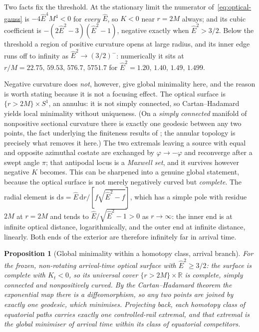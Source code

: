 \documentclass[12pt]{iopart}
\theoremstyle{plain}
\newtheorem{proposition}{Proposition}
\theoremstyle{definition}
\theoremstyle{remark}
\newcommand{\Ehat}{\hat E}
\newcommand{\dd}{\mathrm{d}}
\begin{document}
Two facts fix the threshold. At the stationary limit the numerator
of~\eqref{eq:optical-gauss} is $-4\Ehat^4M^4<0$ for \emph{every} $\Ehat$, so $K<0$
near $r=2M$ always; and its cubic coefficient is
$-(2\Ehat^2-3)(\Ehat^2-1)$, negative exactly when $\Ehat^2>3/2$. Below the
threshold a region of positive curvature opens at large radius, and its inner
edge runs off to infinity as $\Ehat^2\to(3/2)^-$: numerically it sits at
$r/M=22.75,\,59.53,\,576.7,\,5751.7$ for $\Ehat^2=1.20,\,1.40,\,1.49,\,1.499$.

Negative curvature does \emph{not}, however, give global minimality here, and the
reason is worth stating because it is not a focusing effect. The optical surface
is $\{r>2M\}\times S^1$, an annulus: it is not simply connected, so
Cartan--Hadamard yields local minimality without uniqueness. (On a \emph{simply
connected} manifold of nonpositive sectional curvature there is exactly one
geodesic between any two points, the fact underlying the finiteness results of
\cite{GiannoniMasielloPiccione2001}; the annular topology is precisely what
removes it here.) The two extremals
leaving a source with equal and opposite azimuthal costate are exchanged by
$\varphi\to-\varphi$ and reconverge after a swept angle $\pi$; that antipodal
locus is a \emph{Maxwell set}, and it survives however negative $K$ becomes.
This can be sharpened into a genuine global statement, because the optical surface
is not merely negatively curved but \emph{complete}. The radial element is
$\dd s=\Ehat\,\dd r/[f\sqrt{\Ehat^2-f}]$, which has a simple pole with residue
$2M$ at $r=2M$ and tends to $\Ehat/\sqrt{\Ehat^2-1}>0$ as $r\to\infty$: the inner
end is at infinite optical distance, logarithmically, and the outer end at
infinite distance, linearly. Both ends of the exterior are therefore infinitely
far in arrival time.

\begin{proposition}[Global minimality within a homotopy class, arrival branch]
\label{prop:globalmin}
For the frozen, non-rotating \emph{arrival-time} optical surface with
$\Ehat^2\ge3/2$: the surface is complete with $K_t<0$, so its universal cover
$\{r>2M\}\times\mathbb R$ is complete, simply connected and nonpositively
curved. By the Cartan--Hadamard theorem the
exponential map there is a diffeomorphism, so any two points are joined by
exactly one geodesic, which minimises. Projecting back, each homotopy class of
equatorial paths carries \emph{exactly one} controlled-rail extremal, and that
extremal is the \emph{global} minimiser of arrival time within its class of
equatorial competitors.
\end{proposition}
\end{document}
